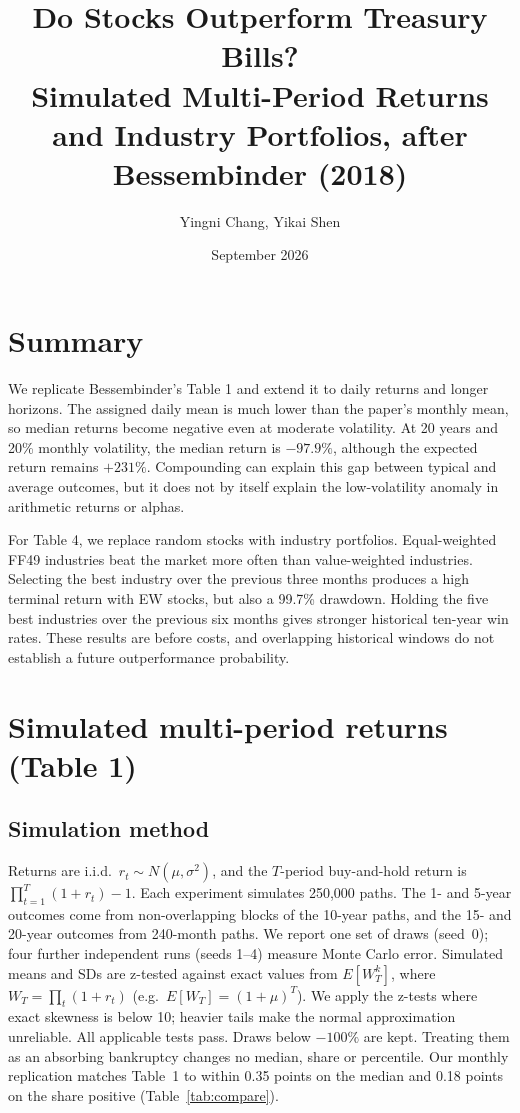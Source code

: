\documentclass[11pt,letterpaper]{article}
\title{\vspace{-1.5em}\textbf{Do Stocks Outperform Treasury Bills?}\\[2pt]
  \large Simulated Multi-Period Returns and Industry Portfolios, after Bessembinder (2018)}
\author{Yingni Chang, Yikai Shen}
\date{September 2026}
\begin{document}
\maketitle
\vspace{-1.5em}

\section*{Summary}

We replicate Bessembinder's Table 1 and extend it to daily returns and longer horizons. The assigned daily
mean is much lower than the paper's monthly mean, so median returns become negative even at moderate
volatility. At 20 years and 20\% monthly volatility, the median return is $-97.9\%$, although the expected
return remains $+231\%$. Compounding can explain this gap between typical and average outcomes, but it
does not by itself explain the low-volatility anomaly in arithmetic returns or alphas.

For Table 4, we replace random stocks with industry portfolios. Equal-weighted FF49 industries beat the
market more often than value-weighted industries. Selecting the best industry over the previous three
months produces a high terminal return with EW stocks, but also a 99.7\% drawdown. Holding the five best
industries over the previous six months gives stronger historical ten-year win rates. These results are
before costs, and overlapping historical windows do not establish a future outperformance probability.

\section{Simulated multi-period returns (Table 1)}

\subsection{Simulation method}

Returns are i.i.d.\ $r_t \sim N(\mu, \sigma^2)$, and the $T$-period buy-and-hold return is
$\prod_{t=1}^{T}(1+r_t) - 1$. Each experiment simulates 250,000 paths. The 1- and 5-year outcomes come from
non-overlapping blocks of the 10-year paths, and the 15- and 20-year outcomes from 240-month paths. We report one
set of draws (seed~0); four further independent runs (seeds 1--4) measure Monte Carlo error. Simulated means and
SDs are z-tested against exact values from $E[W_T^k]$, where $W_T = \prod_t (1+r_t)$ (e.g.\ $E[W_T] = (1+\mu)^T$).
We apply the z-tests where exact skewness is below 10; heavier tails make the normal approximation unreliable.
All applicable tests pass.
Draws below $-100\%$ are kept. Treating them as an absorbing bankruptcy changes no median, share or percentile. Our
monthly replication matches Table~1 to within 0.35 points on the median and 0.18 points on the share positive
(Table~\ref{tab:compare}).
\end{document}
